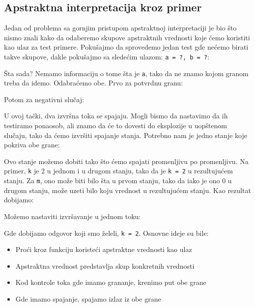 \subsection{Apstraktna interpretacija kroz primer}
\label{subsec:absintex}
Jedan od problema sa gornjim pristupom apstraktnoj interpretaciji je bio što nismo znali kako da odaberemo skupove
apstraktnih vrednosti koje ćemo koristiti kao ulaz za test primere. Pokušajmo da sprovedemo jedan test gde nećemo birati
takve skupove, dakle pokušajmo sa sledećim ulazom: \texttt{a = ?, b = ?}:

Šta sada? Nemamo informaciju o tome šta je \texttt{a}, tako da ne znamo kojom granom treba da idemo. Odabraćemo obe. 
Prvo za potvrdnu granu:

Potom za negativni slučaj:

U ovoj tački, dva izvršna toka se spajaju. Mogli bismo da nastavimo da ih testiramo ponaosob, ali znamo da će to dovesti
do eksplozije u uopštenom slučaju, tako da ćemo izvršiti spajanje stanja. Potrebno nam je jedno stanje koje pokriva obe
grane:

Ovo stanje možemo dobiti tako što ćemo spajati promenljivu po promenljivu. Na primer, \texttt{k} je 2 u jednom i u drugom
stanju, tako da je \texttt{k = 2} u rezultujućem stanju. Za \texttt{m}, ono može biti bilo šta u prvom stanju, tako da iako
je ono 0 u drugom stanju, može uzeti bilo koju vrednost u rezultujućem stanju. Kao rezultat dobijamo:  

Možemo nastaviti izvršavanje u jednom toku:

Gde dobijamo odgovor koji smo želeli, \texttt{k = 2}. Osnovne ideje su bile:
\begin{itemize}
\item Proći kroz funkciju koristeći apstraktne vrednosti kao ulaz
\item Apstraktna vrednost predstavlja skup konkretnih vrednosti
\item Kod kontrole toka gde imamo grananje, krenimo put obe grane
\item Gde imamo spajanje, spajamo izlaz iz obe grane
\end{itemize}
\cite{MozWiki}


